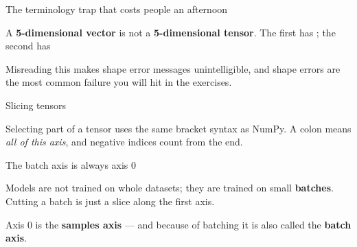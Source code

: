 \documentclass[aspectratio=169,11pt,t]{beamer}
\begin{document}
\begin{frame}[shrink=25]{The terminology trap that costs people an afternoon}
\begin{iband}[rose]
A \textbf{5-dimensional vector} is not a \textbf{5-dimensional tensor}. The first has ; the second has 
\end{iband}
{\fontsize{9.4}{12.6}\selectfont\color{fg2}Misreading this makes shape error messages unintelligible, and shape errors are the most common failure you will hit in the exercises.\par}\vskip 4pt
\end{frame}

\begin{frame}[shrink=25]{Slicing tensors}
{\fontsize{9.4}{12.6}\selectfont\color{fg2}Selecting part of a tensor uses the same bracket syntax as NumPy. A colon means \textit{all of this axis}, and negative indices count from the end.\par}\vskip 4pt
\end{frame}

\begin{frame}[shrink=25]{The batch axis is always axis 0}
{\fontsize{9.4}{12.6}\selectfont\color{fg2}Models are not trained on whole datasets; they are trained on small \textbf{batches}. Cutting a batch is just a slice along the first axis.\par}\vskip 4pt
\begin{iband}[signal]
Axis 0 is the \textbf{samples axis} --- and because of batching it is also called the \textbf{batch axis}. 
\end{iband}
\end{frame}
\end{document}
